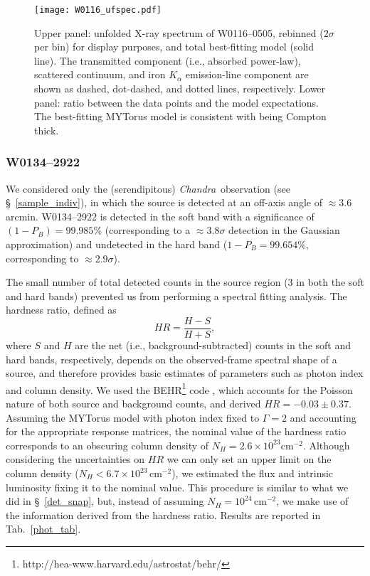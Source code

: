 \documentclass[useAMS,usenatbib]{mnras}
\newcommand*{\chandra}{\textit{Chandra}}
\newcommand*{\nhunits}{\mathrm{cm^{-2}}}
\begin{document}
\begin{figure} 
	\centering
	\texttt{[image: W0116\_ufspec.pdf]}
	\caption{Upper panel: unfolded X-ray spectrum of \mbox{W0116--0505}, rebinned ($2\sigma$ per bin) for display purposes, and total best-fitting model (solid line). The transmitted component (i.e., absorbed power-law), scattered continuum, and iron $K_\alpha$ emission-line component are shown as dashed, dot-dashed, and dotted lines, respectively. Lower panel: ratio between the data points and the model expectations. The best-fitting MYTorus model is consistent with being Compton thick.}
	\label{W0116}
\end{figure}


\subsubsection{W0134--2922}
We considered only the (serendipitous) \chandra\, observation (see \S~\ref{sample_indiv}), in which the source is detected at an off-axis angle of $\approx3.6$ arcmin. W0134--2922 is detected in the soft band with a significance of $(1-P_B)=99.985\%$ (corresponding to a $\approx3.8\sigma$ detection in the Gaussian approximation) and undetected in the hard band ($1-P_B=99.654\%$, corresponding to $\approx2.9\sigma$).

The small number of total detected counts in the source region (3 in both the soft and hard bands) prevented us from performing a spectral fitting analysis. 
The hardness ratio, defined as
\begin{equation}
HR=\frac{H-S}{H+S},
\end{equation}
where $S$ and $H$ are the net (i.e., background-subtracted) counts in the soft and hard bands, respectively, depends on the observed-frame spectral shape of a source, and therefore provides basic estimates of parameters such as photon index and column density. We used the BEHR\footnote{http://hea-www.harvard.edu/astrostat/behr/} code \citep{Park06}, which accounts for the Poisson nature of both source and background counts, and derived $HR=-0.03\pm0.37$. Assuming the MYTorus model with photon index fixed to $\Gamma=2$ and accounting for the appropriate response matrices, the nominal value of the hardness ratio corresponds to an obscuring column density of $N_H=2.6\times10^{23}\nhunits$. Although considering the uncertainties on $HR$ we can only set an upper limit on the column density ($N_H<6.7\times10^{23}\,\nhunits$),
we estimated the flux and intrinsic luminosity fixing it to the nominal value. This procedure is similar to what we did in \S~\ref{det_snap}, but, instead of assuming $N_H=10^{24}\,\nhunits$, we make use of the information derived from the hardness ratio. Results are reported in Tab.~\ref{phot_tab}.
\end{document}
